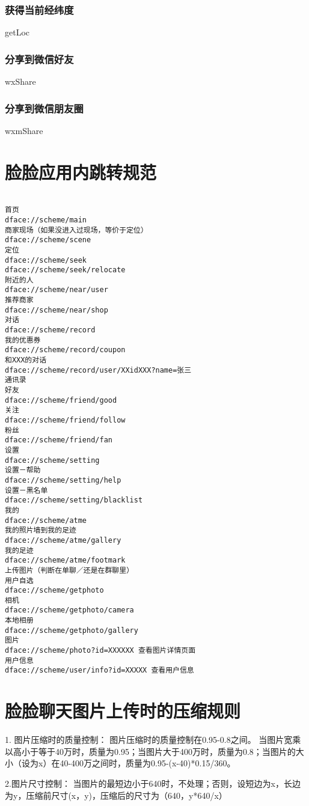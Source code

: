 \documentclass[cs4size]{ctexartutf8}
\begin{document}
\subsubsection{获得当前经纬度}
getLoc

\subsubsection{分享到微信好友}
wxShare

\subsubsection{分享到微信朋友圈}
wxmShare


\section{脸脸应用内跳转规范}
\begin{verbatim}

首页
dface://scheme/main
商家现场（如果没进入过现场，等价于定位）
dface://scheme/scene
定位
dface://scheme/seek
dface://scheme/seek/relocate
附近的人
dface://scheme/near/user
推荐商家
dface://scheme/near/shop
对话
dface://scheme/record
我的优惠券
dface://scheme/record/coupon
和XXX的对话
dface://scheme/record/user/XXidXXX?name=张三
通讯录
好友
dface://scheme/friend/good
关注
dface://scheme/friend/follow
粉丝
dface://scheme/friend/fan
设置
dface://scheme/setting
设置－帮助
dface://scheme/setting/help
设置－黑名单
dface://scheme/setting/blacklist
我的
dface://scheme/atme
我的照片墙到我的足迹
dface://scheme/atme/gallery
我的足迹
dface://scheme/atme/footmark
上传图片（判断在单聊／还是在群聊里）
用户自选
dface://scheme/getphoto 
相机
dface://scheme/getphoto/camera 
本地相册
dface://scheme/getphoto/gallery 
图片
dface://scheme/photo?id=XXXXXX 查看图片详情页面
用户信息
dface://scheme/user/info?id=XXXXX 查看用户信息
\end{verbatim}


\section{脸脸聊天图片上传时的压缩规则}

1. 图片压缩时的质量控制：
图片压缩时的质量控制在0.95-0.8之间。
当图片宽乘以高小于等于40万时，质量为0.95；当图片大于400万时，质量为0.8；当图片的大小（设为x）在40-400万之间时，质量为0.95-(x-40)*0.15/360。

2.图片尺寸控制：
当图片的最短边小于640时，不处理；否则，设短边为x，长边为y，压缩前尺寸(x，y)，压缩后的尺寸为（640，y*640/x）
\end{document}
